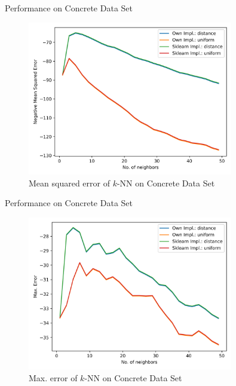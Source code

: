 \documentclass[10pt]{beamer}
\begin{document}
    
    \begin{frame}{Performance on Concrete Data Set}
        \begin{figure}[h!]
            \centering
            \includegraphics[width=0.8\textwidth]{exercise_2/presentation/figures/concrete_knn_scores_mean_sq_err.png}
            \caption{Mean squared error of $k$-NN on Concrete Data Set}
            \label{fig:kNN_concrete_MSE}
       \end{figure}
    \end{frame}
    
    \begin{frame}{Performance on Concrete Data Set}
        \begin{figure}[h!]
            \centering
            \includegraphics[width=0.8\textwidth]{exercise_2/presentation/figures/concrete_knn_scores_max_error.png}
            \caption{Max. error of $k$-NN on Concrete Data Set}
            \label{fig:kNN_concrete_max-error}
       \end{figure}
    \end{frame}
    
\end{document}
